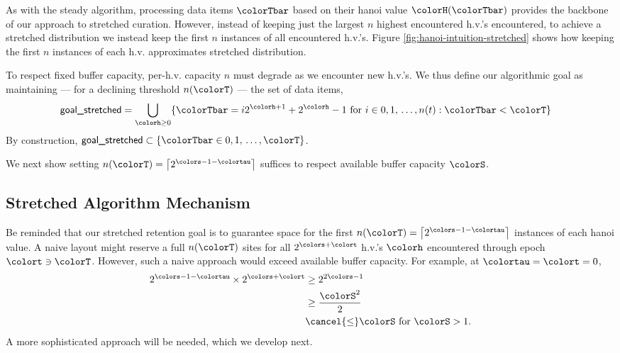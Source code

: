 As with the steady algorithm, processing data items $\colorTbar$ based on their hanoi value $\colorH(\colorTbar)$ provides the backbone of our approach to stretched curation.
However, instead of keeping just the largest $n$ highest encountered h.v.'s encountered, to achieve a stretched distribution we instead keep the first $n$ instances of all encountered h.v.'s.
Figure \ref{fig:hanoi-intuition-stretched} shows how keeping the first $n$ instances of each h.v. approximates stretched distribution.

To respect fixed buffer capacity, per-h.v. capacity $n$ must degrade as we encounter new h.v.'s.
We thus define our algorithmic goal as maintaining --- for a declining threshold $n(\colorT)$ --- the set of data items,
\begin{align*}
\textsf{goal\_stretched}
&=
\bigcup_{\colorh \geq 0}
\{ \colorTbar = i2^{\colorh + 1} + 2^{\colorh} - 1 \text{ for } i \in 0,1,\,\ldots,n(t) : \colorTbar < \colorT \}
\end{align*}
By construction, $\textsf{goal\_stretched} \subset \{ \colorTbar \in 0, 1, \, \ldots, \colorT \}$.

We next show setting $n(\colorT) = \left\lceil 2^{\colors - 1 - \colortau} \right\rceil$ suffices to respect available buffer capacity $\colorS$.





\subsection{Stretched Algorithm Mechanism}
\label{sec:stretched-mechanism}



Be reminded that our stretched retention goal is to guarantee space for the first $n(\colorT) =  \left\lceil2^{\colors - 1 - \colortau}\right\rceil$ instances of each hanoi value.
A naive layout might reserve a full $n(\colorT)$ sites for all $2^{\colors + \colort}$ h.v.'s $\colorh$ encountered through epoch $\colort \ni \colorT$.
However, such a naive approach would exceed available buffer capacity.
For example, at $\colortau=\colort=0$,
\begin{align*}
2^{\colors - 1 - \colortau} \times 2^{\colors + \colort}
&\geq
2^{2\colors - 1}\\
&\geq
\frac{\colorS^{2}}{2}\\
&\cancel{\leq} \colorS \text{ for } \colorS > 1.
\end{align*}
A more sophisticated approach will be needed, which we develop next.

